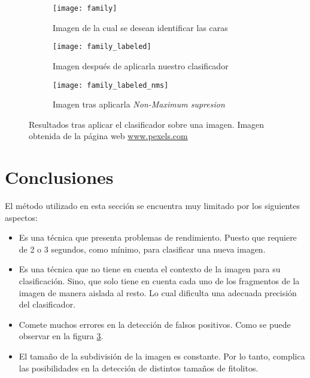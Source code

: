 \begin{figure}
	\centering
	\begin{subfigure}[b]{0.45\textwidth}
        \texttt{[image: family]}
        \caption{Imagen de la cual se desean identificar las caras}
        \label{subfig:family}
    \end{subfigure}
    \begin{subfigure}[b]{0.45\textwidth}
        \texttt{[image: family\_labeled]}
        \caption{Imagen después de aplicarla nuestro clasificador}
        \label{subfig:family_labeled}
    \end{subfigure}
    \begin{subfigure}[b]{0.45\textwidth}
        \texttt{[image: family\_labeled\_nms]}
        \caption{Imagen tras aplicarla \textit{Non-Maximum supresion}}
         \label{subfig:family_labeled_nms}
    \end{subfigure}
        \caption[Resultados tras aplicar el clasificador sobre una imagen]{Resultados tras aplicar el clasificador sobre una imagen. Imagen obtenida de la página web \url{www.pexels.com}}
	\label{fig:5.1.4}
\end{figure}

\section{Conclusiones}

El método utilizado en esta sección se encuentra muy limitado por los siguientes aspectos:

\begin{itemize}
	\item Es una técnica que presenta problemas de rendimiento. Puesto que requiere de 2 o 3 segundos, como mínimo, para clasificar una nueva imagen.
	\item Es una técnica que no tiene en cuenta el contexto de la imagen para su clasificación. Sino, que solo tiene en cuenta cada uno de los fragmentos de la imagen de manera aislada al resto. Lo cual dificulta una adecuada precisión del clasificador.
	\item Comete muchos errores en la detección de falsos positivos. Como se puede observar en la figura \ref{subfig:family_labeled_nms}.
	\item El tamaño de la subdivisión de la imagen es constante. Por lo tanto, complica las posibilidades en la detección de distintos tamaños de fitolitos.
\end{itemize}

